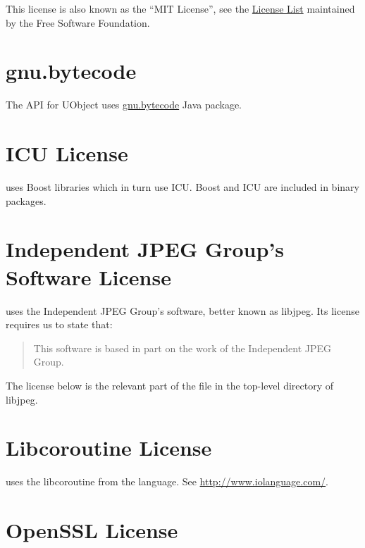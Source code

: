 This license is also known as the ``MIT License'', see the
\href{http://www.gnu.org/licenses/license-list.html}{License List}
maintained by the Free Software Foundation.


\section{gnu.bytecode}
\label{sec:license:gnu.bytecode}
The \Java API for UObject uses
\href{http://www.gnu.org/software/kawa/api/gnu/bytecode/package-summary.html}{gnu.bytecode}
Java package.


\section{ICU License}
\usdk uses Boost libraries which in turn use ICU.  Boost and ICU are
included in binary packages.



\section{Independent JPEG Group's Software License}

\usdk uses the Independent JPEG Group's software, better known as libjpeg.
Its license requires us to state that:

\begin{quote}
  This software is based in part on the work of the Independent JPEG Group.
\end{quote}

The license below is the relevant part of the  file in the
top-level directory of libjpeg.



\section{Libcoroutine License}

\urbi uses the libcoroutine from the  language.  See
\url{http://www.iolanguage.com/}.


\section{OpenSSL License}

